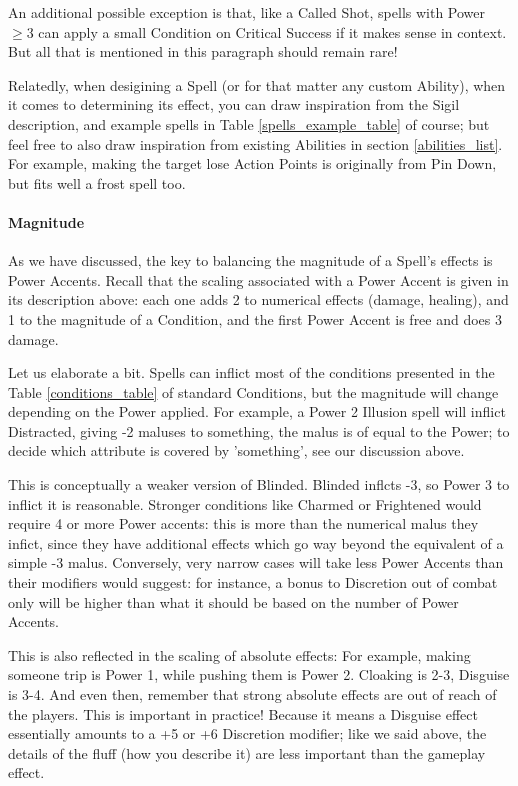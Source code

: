 An additional possible exception is that, like a Called Shot, spells with Power $\geq 3$ can apply a small Condition on Critical Success if it makes sense in context. But all that is mentioned in this paragraph should remain rare!

Relatedly, when desigining a Spell (or for that matter any custom Ability), when it comes to determining its effect, you can draw inspiration from the Sigil description, and example spells in Table \ref{spells_example_table} of course; but feel free to also draw inspiration from existing Abilities in section \ref{abilities_list}. For example, making the target lose Action Points is originally from Pin Down, but fits well a frost spell too.






\paragraph{Magnitude}

As we have discussed, the key to balancing the magnitude of a Spell's effects is Power Accents. Recall that the scaling associated with a Power Accent is given in its description above: each one adds 2 to numerical effects (damage, healing), and 1 to the magnitude of a Condition, and the first Power Accent is free and does 3 damage.

Let us elaborate a bit. Spells can inflict most of the conditions presented in the Table \ref{conditions_table} of standard Conditions, but the magnitude will change depending on the Power applied. For example, a Power 2 Illusion spell will inflict Distracted, giving -2 maluses to something, the malus is of equal to the Power; to decide which attribute is covered by 'something', see our discussion above.

This is conceptually a weaker version of Blinded. Blinded inflcts -3, so Power 3 to inflict it is reasonable. Stronger conditions like Charmed or Frightened would require 4 or more Power accents: this is more than the numerical malus they infict, since they have additional effects which go way beyond the equivalent of a simple -3 malus. Conversely, very narrow cases will take less Power Accents than their modifiers would suggest: for instance, a bonus to Discretion out of combat only will be higher than what it should be based on the number of Power Accents.

This is also reflected in the scaling of absolute effects: For example, making someone trip is Power 1, while pushing them is Power 2. Cloaking is 2-3, Disguise is 3-4. And even then, remember that strong absolute effects are out of reach of the players. This is important in practice! Because it means a Disguise effect essentially amounts to a +5 or +6 Discretion modifier; like we said above, the details of the fluff (how you describe it) are less important than the gameplay effect.

